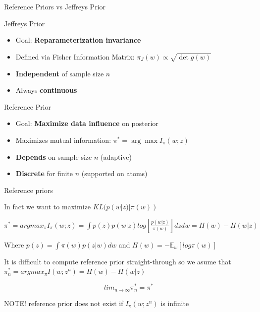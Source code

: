 \documentclass{beamer}
\begin{document}
\begin{frame}{Reference Priors vs Jeffreys Prior}

\begin{block}{Jeffreys Prior}
\begin{itemize}
\item Goal: \textbf{Reparameterization invariance}
\item Defined via Fisher Information Matrix: $\pi_J(w) \propto \sqrt{\det g(w)}$
\item \textbf{Independent} of sample size $n$
\item Always \textbf{continuous}
\end{itemize}
\end{block}

\begin{block}{Reference Prior}
\begin{itemize}
\item Goal: \textbf{Maximize data influence} on posterior
\item Maximizes mutual information: $\pi^* = \arg\max I_{\pi}(w; z)$
\item \textbf{Depends} on sample size $n$ (adaptive)
\item \textbf{Discrete} for finite $n$ (supported on atoms)
\end{itemize}
\end{block}

\end{frame}

\begin{frame}{Reference priors}

In fact we want to maximize $KL(p(w|z) | \pi(w))$

\space 


$
\pi^*=argmax_{\pi} I_{\pi}(w;z)=\int p(z) p(w|z) log[\frac{p(w|z)}{\pi(w)}] dz dw = H(w) - H(w|z)
$

Where $p(z)=\int \pi(w) p(z|w) dw$ and $H(w)=-\mathbb{E}_w [log \pi(w)]$

It is difficult to compute reference prior straight-through so we asume that
$\pi_n^*=argmax_{\pi} I (w;z^n)=H(w)-H(w|z)$

\[
lim_{n \rightarrow \infty} \pi_n^* = \pi^*
\]

NOTE!  reference prior does not exist if $I_\pi(w; z^
n)$ is infinite


\end{frame}
\end{document}
